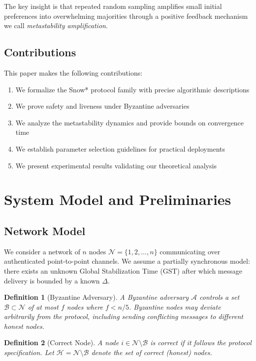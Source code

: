 \documentclass[11pt,a4paper]{article}
\newtheorem{definition}{Definition}
\begin{document}
The key insight is that repeated random sampling amplifies small initial preferences into overwhelming majorities through a positive feedback mechanism we call \emph{metastability amplification}.

\subsection{Contributions}

This paper makes the following contributions:

\begin{enumerate}
    \item We formalize the Snow* protocol family with precise algorithmic descriptions
    \item We prove safety and liveness under Byzantine adversaries
    \item We analyze the metastability dynamics and provide bounds on convergence time
    \item We establish parameter selection guidelines for practical deployments
    \item We present experimental results validating our theoretical analysis
\end{enumerate}

\section{System Model and Preliminaries}

\subsection{Network Model}

We consider a network of $n$ nodes $\mathcal{N} = \{1, 2, \ldots, n\}$ communicating over authenticated point-to-point channels. We assume a partially synchronous model: there exists an unknown Global Stabilization Time (GST) after which message delivery is bounded by a known $\Delta$.

\begin{definition}[Byzantine Adversary]
A Byzantine adversary $\mathcal{A}$ controls a set $\mathcal{B} \subset \mathcal{N}$ of at most $f$ nodes where $f < n/5$. Byzantine nodes may deviate arbitrarily from the protocol, including sending conflicting messages to different honest nodes.
\end{definition}

\begin{definition}[Correct Node]
A node $i \in \mathcal{N} \setminus \mathcal{B}$ is correct if it follows the protocol specification. Let $\mathcal{H} = \mathcal{N} \setminus \mathcal{B}$ denote the set of correct (honest) nodes.
\end{definition}
\end{document}
